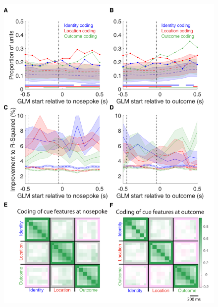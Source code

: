 \documentclass[11pt]{article}
\begin{document}
 \begin{figure}[ht!]
\centering
\includegraphics[height=0.7\textheight]{Fig 8 - SUPP GLM.pdf}

\end{figure}
\end{document}
